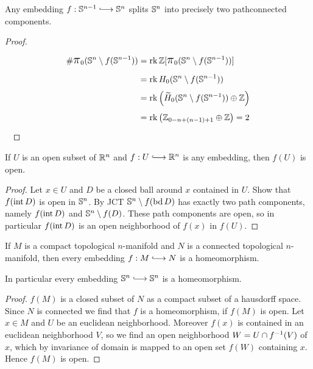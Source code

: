 	\begin{corollary}
		Any embedding $f:\S^{n-1} \longrightincl \S^n$ splits $\S^n$ into precisely two pathconnected components.
	\end{corollary}
	\begin{proof}
		~\vspace{-2.55em}
		\begin{align*}
			\# \largepi_0(\S^n \setminus f(\S^{n-1})) &= \rk \Z[\largepi_0(\S^n \setminus f(\S^{n-1}))]\\
			&= \rk H_0(\S^n \setminus f(\S^{n-1}))\\
			&= \rk \left (\widetilde{H}_0(\S^n \setminus f(\S^{n-1})) \oplus \Z\right)\\
			&= \rk \left (\Z_{0-n+(n-1)+1} \oplus \Z\right) = 2
		\end{align*}
		~\vspace{-2em}
	\end{proof}

	\begin{corollary}
		If $U$ is an open subset of $\R^n$ and $f: U \longrightincl \R^n$ is any embedding, then $f(U)$ is open.
	\end{corollary}
	\begin{proof}
		Let $x \in U$ and $D$ be a closed ball around $x$ contained in $U$. Show that $f(\interior D)$ is open in $\S^n$. By JCT $\S^n \setminus f(\boundary D)$ has exactly two path components, namely $f(\interior D)$ and $\S^n \setminus f(D)$. These path components are open, so in particular $f(\interior D)$ is an open neighborhood of $f(x)$ in $f(U)$.
	\end{proof}

	\begin{corollary}
		If $M$ is a compact topological $n$-manifold and $N$ is a connected topological $n$-manifold, then every embedding $f: M \longrightincl N$ is a homeomorphism.

		In particular every embedding $\S^n \longrightincl \S^n$ is a homeomorphism.
	\end{corollary}
	\begin{proof}
		$f(M)$ is a closed subset of $N$ as a compact subset of a hausdorff space. Since $N$ is connected we find that $f$ is a homeomorphism, if $f(M)$ is open. Let $x \in M$ and $U$ be an euclidean neighborhood. Moreover $f(x)$ is contained in an euclidean neighborhood $V$, so we find an open neighborhood $W = U \intersection f^{-1}(V)$ of $x$, which by invariance of domain is mapped to an open set $f(W)$ containing $x$. Hence $f(M)$ is open.
	\end{proof}

